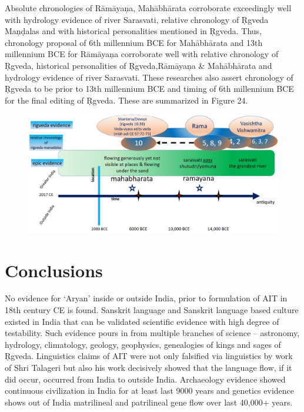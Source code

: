 Absolute chronologies of Rāmāyaņa, Mahābhārata corroborate exceedingly well with hydrology evidence of river Sarasvati, relative chronology of Ṛgveda Maņḍalas and with historical personalities mentioned in Ṛgveda. Thus, chronology proposal of 6th millennium BCE for Mahābhārata and 13th millennium BCE for Rāmāyaņa corroborate well with relative chronology of Ṛgveda, historical personalities of Ṛgveda,\break Rāmāyaņa \& Mahābhārata and hydrology evidence of river Sarasvati. These researches also assert chronology of Ṛgveda to be prior to 13th millennium BCE and timing of 6th millennium BCE for the final editing of Ṛgveda. These are summarized in Figure 24.

\begin{figure}[!htbp]
\includegraphics[scale=0.205]{"images/8-24.jpg"}
\caption{}\label{art8-fig24}
\end{figure}



\section*{Conclusions}

No evidence for ‘Aryan’ inside or outside India, prior to formulation of AIT in 18th century CE is found. Sanskrit language and Sanskrit language based culture existed in India that can be validated scientific evidence with high degree of testability. Such evidence pours in from multiple branches of science – astronomy, hydrology, climatology, geology, geophysics, genealogies of kings and sages of Ṛgveda. Linguistics claims of AIT were not only falsified via linguistics by work of Shri Talageri but also his work decisively showed that the language flow, if it did occur, occurred from India to outside India. Archaeology evidence showed continuous civilization in India for at least last 9000 years and genetics evidence shows out of India matrilineal and patrilineal gene flow over last 40,000+ years.

